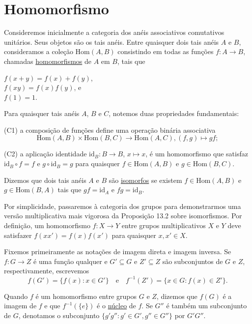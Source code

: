 \section{Homomorfismo}

Consideremos inicialmente a categoria dos anéis associativos comutativos unitários.
Seus objetos são os tais anéis. Entre quaisquer dois tais anéis $A$ e $B$,
consideramos a coleção $\mathrm{Hom}(A,B)$ consistindo em todas as funções
$f : A \to B$, chamadas \underline{homomorfismos} de $A$ em $B$, tais que
\begin{center}
$f(x+y) = f(x) + f(y)$, \\
$f(xy) = f(x)f(y)$, e\\
$f(1) = 1$.
\end{center} 

Para quaisquer tais anéis $A$, $B$ e $C$, notemos duas propriedades fundamentais:

(C1) a composição de funções define uma operação binária associativa
\[
\mathrm{Hom}(A,B) \times \mathrm{Hom}(B,C) \to \mathrm{Hom}(A,C), (f,g) \mapsto gf;
\]

(C2) a aplicação identidade $\mathrm{id}_B \colon B \to B$, $x \mapsto x$,
é um homomorfismo que satisfaz $\mathrm{id}_B \circ f = f$ e $g \circ \mathrm{id}_B = g$
para quaisquer $f \in \mathrm{Hom}(A,B)$ e $g \in \mathrm{Hom}(B,C)$.

\begin{definicao}
Dizemos que dois tais anéis $A$ e $B$ são \underline{isomorfos} se existem
$f \in \mathrm{Hom}(A,B)$ e $g \in \mathrm{Hom}(B,A)$ tais que $gf = \mathrm{id}_A$
e $fg = \mathrm{id}_B$.
\end{definicao}

Por simplicidade, passaremos à categoria dos grupos para demonstrarmos
uma versão multiplicativa mais vigorosa da Proposição 13.2 sobre isomorfismos.
Por definição, um homomorfismo $f : X \to Y$ entre grupos multiplicativos $X$ e $Y$ deve satisfazer
$f(xx') = f(x)f(x')$ para quaisquer $x, x' \in X$.

Fixemos primeiramente as notações de imagem direta e imagem inversa.
Se $f : G \to Z$ é uma função qualquer e $G' \subseteq G$ e
$Z' \subseteq Z$ são subconjuntos de $G$ e $Z$, respectivamente, escrevemos
\[
f(G') = \{f(x) : x \in G'\}
\quad \text{e} \quad
f^{-1}(Z') = \{x \in G : f(x) \in Z'\}.
\]

Quando $f$ é um homomorfismo entre grupos $G$ e $Z$, dizemos que $f(G)$
é a imagem de $f$ e que $f^{-1}(\{e\})$ é o \underline{núcleo} de $f$.
Se $G''$ é também um subconjunto de $G$, denotamos o subconjunto
$\{g'g'' : g' \in G', g'' \in G'' \}$ por $G'G''$.

